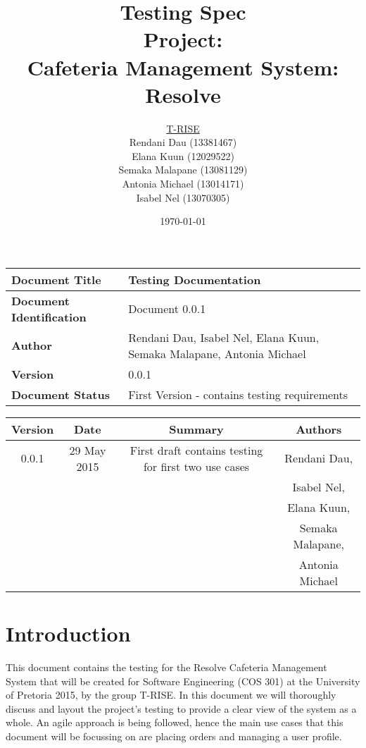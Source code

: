 \documentclass[a4paper,12pt]{article}
\title{\Huge Testing Spec\\ 
	 Project: \\ 
	Cafeteria Management System: Resolve}
\author{
         \underline{T-RISE}\\
          Rendani Dau (13381467) \\
	Elana Kuun (12029522) \\
	Semaka Malapane (13081129) \\
	Antonia Michael (13014171) \\
	Isabel Nel (13070305)}
\date{\today}
\begin{document}
\maketitle
\break

\tableofcontents
\break


 \begin{tabu} to 0.8\textwidth { | X[l] | X[l] | }
 \hline
 \textbf{Document Title} & Testing Documentation \\
 \hline
 \textbf{Document Identification}  & Document 0.0.1  \\
 \hline
 \textbf{Author}  & Rendani Dau, Isabel Nel, Elana Kuun, Semaka Malapane, Antonia Michael \\
 \hline
 \textbf{Version} & 0.0.1 \\
 \hline
 \textbf{Document Status} & First Version - contains testing requirements  \\
 \hline
 \end{tabu}

\begin{table}[h!]
\centering
 \begin{tabular}{||c c c c||} 
 \hline
 \textbf{Version} & \textbf{Date} & \textbf{Summary} & \textbf{Authors} \\ [0.5ex] 
 \hline\hline
 0.0.1 & 29 May 2015 & First draft contains testing for first two use cases & Rendani Dau, \\ & & & Isabel Nel, \\ & & & Elana Kuun, \\ & & & Semaka Malapane, \\ & & & Antonia Michael \\   [1ex] 
 \hline
 \end{tabular}
\end{table}

\pagebreak
\section{Introduction}
This document contains the   testing for the Resolve Cafeteria Management System that will be created for Software Engineering (COS 301) at the University of Pretoria 2015, by the group T-RISE. In this document we will thoroughly discuss and layout the project's testing to provide a clear view of the system as a whole. An agile approach is being followed, hence the main use cases that this document will be focussing on are placing orders and managing a user profile.  
\end{document}
